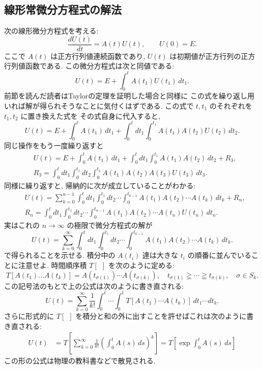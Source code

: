 \documentclass[12pt,twoside]{jarticle}
\theoremstyle{jplain}
\theoremstyle{jplain}
\theoremstyle{jplain}
\numberwithin{theorem}{section}
\numberwithin{equation}{section}
\numberwithin{figure}{section}
\numberwithin{table}{section}
\begin{document}

\subsection{線形常微分方程式の解法}
\label{sec:LODE}

次の線形微分方程式を考える:
\[
\frac{dU(t)}{dt} = A(t)U(t), \qquad U(0)=E.
\]
ここで $A(t)$ は正方行列値連続函数であり, 
$U(t)$ は初期値が正方行列の正方行列値函数である.
この微分方程式は次と同値である:
\[
U(t) = E + \int_0^t A(t_1)U(t_1)\,dt_1.
\]
前節を読んだ読者はTaylorの定理を証明した場合と同様に
この式を繰り返し用いれば解が得られそうなことに気付くはずである.
この式で $t,t_1$ のそれぞれを $t_1,t_2$ に置き換えた式を
その式自身に代入すると, 
\[
U(t)=E+\int_0^t A(t_1)\,dt_1 + \int_0^t\!\!\!dt_1\int_0^{t_1}A(t_1)A(t_2)U(t_2)\,dt_2.
\]
同じ操作をもう一度繰り返すと
\begin{align*}
&
U(t)=E+\int_0^t A(t_1)\,dt_1
+\int_0^t\!\!\!dt_1\int_0^{t_1} A(t_1)A(t_2)\,dt_2
+R_3,
\\ &
R_3 = \int_0^t\!\!\!dt_1\int_0^{t_1}\!\!\!dt_2\int_0^{t_2}A(t_1)A(t_2)A(t_3)U(t_3)\,dt_3.
\end{align*}
同様に繰り返すと, 帰納的に次が成立していることがわかる:
\begin{align*}
&
U(t)=\sum_{k=0}^{n-1} 
\int_0^t\!\!\!dt_1\int_0^{t_1}\!\!\!dt_2\cdots\int_0^{t_{k-1}}
A(t_1)A(t_2)\cdots A(t_k)\,dt_k
+R_n,
\\ &
R_n=\int_0^t\!\!\!dt_1\int_0^{t_1}\!\!\!dt_2\cdots\int_0^{t_{n-1}}
A(t_1)A(t_2)\cdots A(t_n)U(t_n)\,dt_n.
\end{align*}
実はこれの $n\to\infty$ の極限で微分方程式の解が
\[
U(t)=\sum_{k=0}^\infty 
\int_0^t\!\!\!dt_1\int_0^{t_1}\!\!\!dt_2\cdots\int_0^{t_{k-1}}
A(t_1)A(t_2)\cdots A(t_k)\,dt_k.
\]
で得られることを示せる.
積分中の $A(t_i)$ 達は大きな $t_i$ の順番に並んでいることに注意せよ.
時間順序積 $T[\ \ ]$ を次のように定める:
\[
T[A(t_1)\ldots A(t_k)]
= A(t_{\sigma(1)})\cdots A(t_{\sigma(k)}),
\quad
t_{\sigma(1)}\geqq\cdots\geqq t_{\sigma(k)},
\quad
\sigma\in S_k.
\]
この記号法のもとで上の公式は次のように書き直される:
\[
U(t)=\sum_{k=0}^\infty\frac{1}{k!}\int_0^t\cdots\int_0^t T[A(t_1)\cdots A(t_k)]\,dt_1\cdots dt_k.
\]
さらに形式的に $T[\ \ ]$ を積分と和の外に出すことを許せばこれは次のように書き直される:
\begin{align*}
U(t)
&=T\left[
\sum_{k=0}^\infty \frac{1}{k!}
\left(\int_0^t A(s)\,ds\right)^k
\right]
=T\left[\exp\int_0^t A(s)\,ds \right]
\end{align*}
この形の公式は物理の教科書などで散見される.
\end{document}
